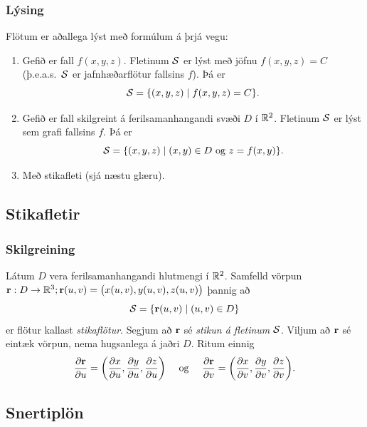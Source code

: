 \subsubsection{Lýsing  \rtask{}}
Flötum er aðallega lýst með formúlum á þrjá vegu:

\begin{enumerate}
 \item Gefið er fall $f(x,y,z)$.  Fletinum $\cal S$ er lýst með jöfnu 
$f(x,y,z)=C$ (þ.e.a.s.~$\cal S$ er jafnhæðarflötur fallsins $f$).  Þá
er
$${\cal S}=\{(x,y,z)\mid f(x,y,z)=C\}.$$

\item Gefið er fall skilgreint á ferilsamanhangandi 
svæði $D$ í ${\mathbb R}^2$.  Fletinum $\cal S$
er lýst sem grafi fallsins $f$.  Þá er
$${\cal S}=\{(x,y,z)\mid (x,y)\in D\mbox{ og } z=f(x,y)\}.$$

\item Með stikafleti (sjá næstu glæru). 
\end{enumerate}







\subsection{Stikafletir} 

\subsubsection{Skilgreining  \rtask{}}

Látum $D$ vera ferilsamanhangandi hlutmengi í ${\mathbb R}^2$.  Samfelld vörpun
$\mbox{${\bf r}$}:D\rightarrow {\mathbb R}^3; \mbox{${\bf r}$} (u,v)=\big(x(u,v), y(u,v), z(u,v)\big)$  
þannig að  
$${\cal S}=\{\mbox{${\bf r}$}(u,v)\mid (u,v)\in D\}$$
er flötur kallast {\em stikaflötur}.  Segjum að $\mbox{${\bf r}$}$ sé {\em stikun á
  fletinum} $\cal S$. 
Viljum að $\mbox{${\bf r}$}$ sé eintæk vörpun, nema hugsanlega á jaðri $D$.
Ritum einnig 
$$\frac{\partial \mbox{${\bf r}$}}{\partial u}=
\bigg(\frac{\partial x}{\partial u}, \frac{\partial y}{\partial u},
\frac{\partial z}{\partial u}\bigg)\quad\mbox{ og }\quad
\frac{\partial \mbox{${\bf r}$}}{\partial v}=
\bigg(\frac{\partial x}{\partial v}, \frac{\partial y}{\partial v},
\frac{\partial z}{\partial v}\bigg).$$





\subsection{Snertiplön} 

